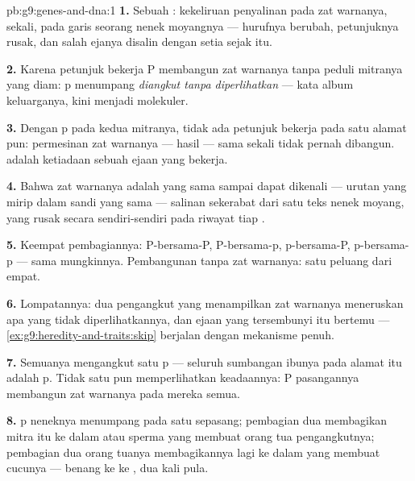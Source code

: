 \begin{solution}{pb:g9:genes-and-dna:1}
\textbf{1.} Sebuah : kekeliruan penyalinan pada 
zat warnanya, sekali, pada garis  seorang nenek
moyangnya --- hurufnya berubah, petunjuknya rusak, dan salah
ejanya disalin dengan setia sejak itu.

\textbf{2.} Karena petunjuk bekerja P membangun zat warnanya
tanpa peduli mitranya yang diam: p menumpang \emph{diangkut
tanpa diperlihatkan} --- kata album keluarganya, kini
menjadi molekuler.

\textbf{3.} Dengan p pada kedua mitranya, tidak ada petunjuk
bekerja pada satu alamat pun: permesinan zat warnanya ---
hasil  --- sama sekali tidak pernah dibangun.
 adalah ketiadaan sebuah ejaan yang bekerja.

\textbf{4.} Bahwa  zat warnanya adalah  yang sama
sampai dapat dikenali --- urutan yang mirip dalam sandi yang
sama --- salinan sekerabat dari satu teks nenek moyang, yang
rusak secara sendiri-sendiri pada riwayat tiap .

\textbf{5.} Keempat pembagiannya: P-bersama-P, P-bersama-p,
p-bersama-P, p-bersama-p --- sama mungkinnya. Pembangunan
tanpa zat warnanya: satu peluang dari empat.

\textbf{6.} Lompatannya: dua pengangkut yang menampilkan zat
warnanya meneruskan apa yang tidak diperlihatkannya, dan
ejaan yang tersembunyi itu bertemu ---
\cref{ex:g9:heredity-and-traits:skip} berjalan dengan
mekanisme penuh.

\textbf{7.} Semuanya mengangkut satu p --- seluruh sumbangan
ibunya pada alamat itu adalah p. Tidak satu pun
memperlihatkan keadaannya: P pasangannya membangun zat
warnanya pada mereka semua.

\textbf{8.} p neneknya menumpang pada satu  sepasang;
pembagian dua  membagikan mitra itu ke dalam 
atau sperma yang membuat orang tua pengangkutnya; pembagian
dua orang tuanya membagikannya lagi ke dalam  yang
membuat cucunya --- benang ke  ke , dua kali pula.


\end{solution}
